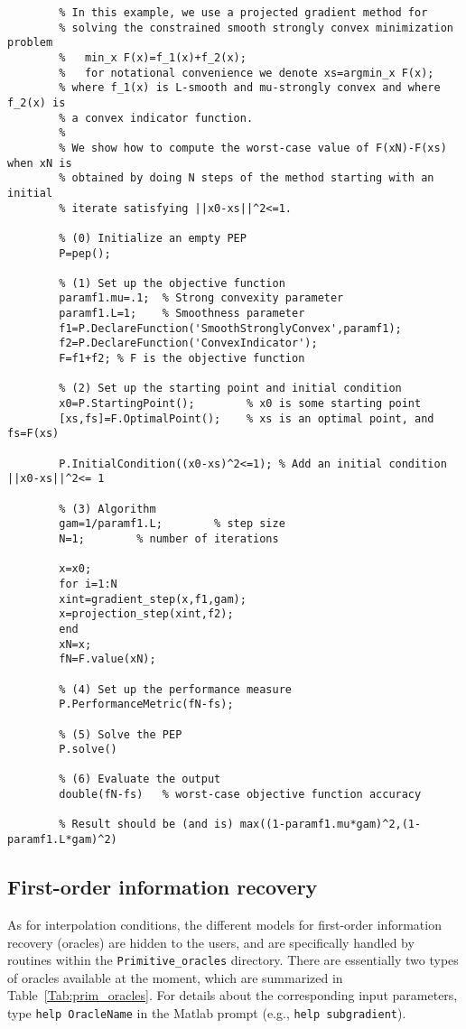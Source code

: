 \documentclass[11pt,a4paper]{article}
\begin{document}
		\begin{lstlisting}
		% In this example, we use a projected gradient method for
		% solving the constrained smooth strongly convex minimization problem
		%   min_x F(x)=f_1(x)+f_2(x);
		%   for notational convenience we denote xs=argmin_x F(x);
		% where f_1(x) is L-smooth and mu-strongly convex and where f_2(x) is
		% a convex indicator function.
		%
		% We show how to compute the worst-case value of F(xN)-F(xs) when xN is
		% obtained by doing N steps of the method starting with an initial
		% iterate satisfying ||x0-xs||^2<=1.

		% (0) Initialize an empty PEP
		P=pep();

		% (1) Set up the objective function
		paramf1.mu=.1;	% Strong convexity parameter
		paramf1.L=1;    % Smoothness parameter
		f1=P.DeclareFunction('SmoothStronglyConvex',paramf1);
		f2=P.DeclareFunction('ConvexIndicator');
		F=f1+f2; % F is the objective function

		% (2) Set up the starting point and initial condition
		x0=P.StartingPoint();		 % x0 is some starting point
		[xs,fs]=F.OptimalPoint(); 	 % xs is an optimal point, and fs=F(xs)

		P.InitialCondition((x0-xs)^2<=1); % Add an initial condition ||x0-xs||^2<= 1

		% (3) Algorithm
		gam=1/paramf1.L;		% step size
		N=1;		% number of iterations

		x=x0;
		for i=1:N
		xint=gradient_step(x,f1,gam);
		x=projection_step(xint,f2);
		end
		xN=x;
		fN=F.value(xN);

		% (4) Set up the performance measure
		P.PerformanceMetric(fN-fs);

		% (5) Solve the PEP
		P.solve()

		% (6) Evaluate the output
		double(fN-fs)   % worst-case objective function accuracy

		% Result should be (and is) max((1-paramf1.mu*gam)^2,(1-paramf1.L*gam)^2)
		\end{lstlisting}
		\newpage
		\subsection{First-order information recovery}\label{sec:oracles}
		As for interpolation conditions, the different models for first-order information recovery (oracles) are hidden to the users, and are specifically handled by routines within the \verb?Primitive_oracles? directory. There are essentially two types of oracles available at the moment, which are summarized in Table~\ref{Tab:prim_oracles}.  For details about the corresponding input parameters, type \verb?help OracleName? in the Matlab prompt (e.g., \verb?help subgradient?).
\end{document}
